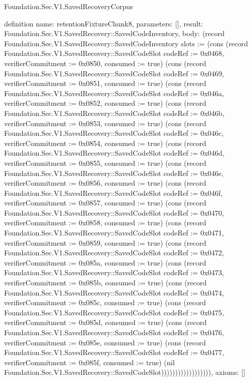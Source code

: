 \begin{lexlean}{Foundation.Sec.V1.SavedRecoveryCorpus}
\begin{semanticmodule}
definition{
  name: retentionFixtureChunk8,
  parameters: [],
  result: Foundation.Sec.V1.SavedRecovery::SavedCodeInventory,
  body: (record Foundation.Sec.V1.SavedRecovery::SavedCodeInventory {slots := (cons (record Foundation.Sec.V1.SavedRecovery::SavedCodeSlot {codeRef := 0x0468, verifierCommitment := 0x0850, consumed := true}) (cons (record Foundation.Sec.V1.SavedRecovery::SavedCodeSlot {codeRef := 0x0469, verifierCommitment := 0x0851, consumed := true}) (cons (record Foundation.Sec.V1.SavedRecovery::SavedCodeSlot {codeRef := 0x046a, verifierCommitment := 0x0852, consumed := true}) (cons (record Foundation.Sec.V1.SavedRecovery::SavedCodeSlot {codeRef := 0x046b, verifierCommitment := 0x0853, consumed := true}) (cons (record Foundation.Sec.V1.SavedRecovery::SavedCodeSlot {codeRef := 0x046c, verifierCommitment := 0x0854, consumed := true}) (cons (record Foundation.Sec.V1.SavedRecovery::SavedCodeSlot {codeRef := 0x046d, verifierCommitment := 0x0855, consumed := true}) (cons (record Foundation.Sec.V1.SavedRecovery::SavedCodeSlot {codeRef := 0x046e, verifierCommitment := 0x0856, consumed := true}) (cons (record Foundation.Sec.V1.SavedRecovery::SavedCodeSlot {codeRef := 0x046f, verifierCommitment := 0x0857, consumed := true}) (cons (record Foundation.Sec.V1.SavedRecovery::SavedCodeSlot {codeRef := 0x0470, verifierCommitment := 0x0858, consumed := true}) (cons (record Foundation.Sec.V1.SavedRecovery::SavedCodeSlot {codeRef := 0x0471, verifierCommitment := 0x0859, consumed := true}) (cons (record Foundation.Sec.V1.SavedRecovery::SavedCodeSlot {codeRef := 0x0472, verifierCommitment := 0x085a, consumed := true}) (cons (record Foundation.Sec.V1.SavedRecovery::SavedCodeSlot {codeRef := 0x0473, verifierCommitment := 0x085b, consumed := true}) (cons (record Foundation.Sec.V1.SavedRecovery::SavedCodeSlot {codeRef := 0x0474, verifierCommitment := 0x085c, consumed := true}) (cons (record Foundation.Sec.V1.SavedRecovery::SavedCodeSlot {codeRef := 0x0475, verifierCommitment := 0x085d, consumed := true}) (cons (record Foundation.Sec.V1.SavedRecovery::SavedCodeSlot {codeRef := 0x0476, verifierCommitment := 0x085e, consumed := true}) (cons (record Foundation.Sec.V1.SavedRecovery::SavedCodeSlot {codeRef := 0x0477, verifierCommitment := 0x085f, consumed := true}) (nil Foundation.Sec.V1.SavedRecovery::SavedCodeSlot)))))))))))))))))}),
  axioms: []
}


\end{semanticmodule}
\end{lexlean}
